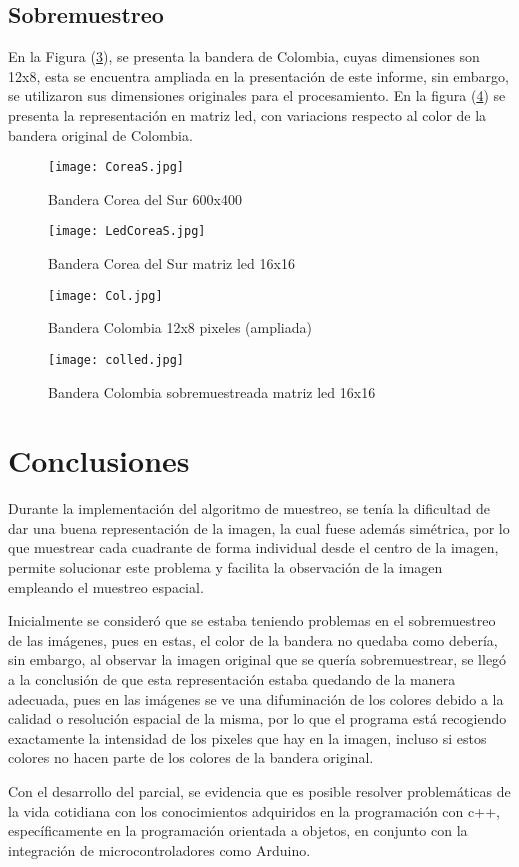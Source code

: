 \documentclass{article}
\begin{document}
\subsection{Sobremuestreo}
En la Figura (\ref{fig:Colombia}), se presenta la bandera de Colombia, cuyas dimensiones son 12x8, esta se encuentra ampliada en la presentación de este informe, sin embargo, se utilizaron sus dimensiones originales para el procesamiento. En la figura (\ref{fig:Colombialed}) se presenta la representación en matriz led, con variacions respecto al color de la bandera original de Colombia.
\begin{figure}[h]
\texttt{[image: CoreaS.jpg]}
\centering
\caption{Bandera Corea del Sur 600x400}
\label{fig:CoreaS}
\end{figure}
\begin{figure}[h]
\texttt{[image: LedCoreaS.jpg]}
\centering
\caption{Bandera Corea del Sur matriz led 16x16}
\label{fig:CoreaSled}
\end{figure}

\begin{figure}[h]
\texttt{[image: Col.jpg]}
\centering
\caption{Bandera Colombia 12x8 pixeles (ampliada)}
\label{fig:Colombia}
\end{figure}

\begin{figure}[h]
\texttt{[image: colled.jpg]}
\centering
\caption{Bandera Colombia sobremuestreada matriz led 16x16}
\label{fig:Colombialed}
\end{figure}

\section{Conclusiones}
Durante la implementación del algoritmo de muestreo, se tenía la dificultad de dar una buena representación de la imagen, la cual fuese además simétrica, por lo que muestrear cada cuadrante de forma individual desde el centro de la imagen, permite solucionar este problema y facilita la observación de la imagen empleando el muestreo espacial.

Inicialmente se consideró que se estaba teniendo problemas en el sobremuestreo de las imágenes, pues en estas, el color de la bandera no quedaba como debería, sin embargo, al observar la imagen original que se quería sobremuestrear, se llegó a la conclusión de que esta representación estaba quedando de la manera adecuada, pues en las imágenes se ve una difuminación de los colores debido a la calidad o resolución espacial de la misma, por lo que el programa está recogiendo exactamente la intensidad de los pixeles que hay en la imagen, incluso si estos colores no hacen parte de los colores de la bandera original.

Con el desarrollo del parcial, se evidencia que es posible resolver problemáticas de la vida cotidiana con los conocimientos adquiridos en la programación con c++, específicamente en la programación orientada a objetos, en conjunto con la integración de microcontroladores como Arduino.

\nocite{*}

\end{document}
